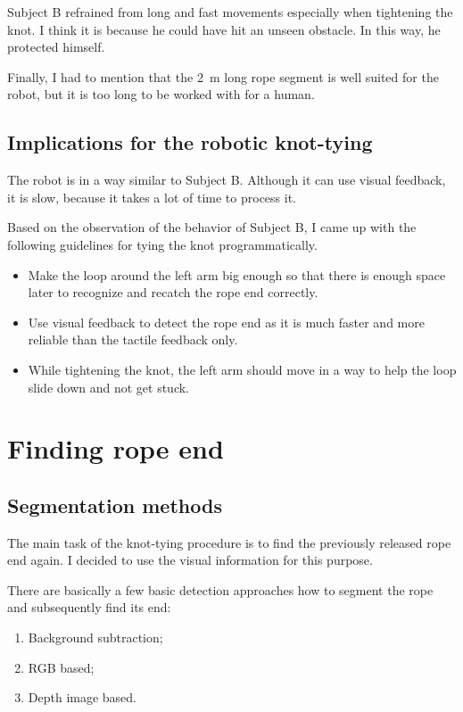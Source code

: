             Subject B refrained from long and fast movements especially when tightening the knot. I think it is because he could have hit an unseen obstacle. In this way, he protected himself.

            Finally, I had to mention that the \SI{2}{m} long rope segment is well suited for the \CloPeMa\/ robot, but it is too long to be worked with for a human.


        \subsection{Implications for the robotic knot-tying}
            The \CloPeMa\/ robot is in a way similar to Subject B. Although it can use visual feedback, it is slow, because it takes a lot of time to process it.

            Based on the observation of the behavior of Subject B, I came up with the following guidelines for tying the knot programmatically.
%
            \begin{itemize}
                \item Make the loop around the left arm big enough so that there is enough space later to recognize and recatch the rope end correctly.

                \item Use visual feedback to detect the rope end as it is much faster and more reliable than the tactile feedback only.

                \item While tightening the knot, the left arm should move in a way to help the loop slide down and not get stuck.

            \end{itemize}

    \section{Finding rope end}

        \subsection{Segmentation methods}

            The main task of the knot-tying procedure is to find the previously released rope end again. I decided to use the visual information for this purpose.

            There are basically a few basic detection approaches how to segment the rope and subsequently find its end:
%
            \begin{enumerate}\itemsep0pt
                \item Background subtraction; \label{it: background subtraction}
                \item RGB based; \label{it: rgb}
                \item Depth image based. \label{it: depth}
            \end{enumerate}

